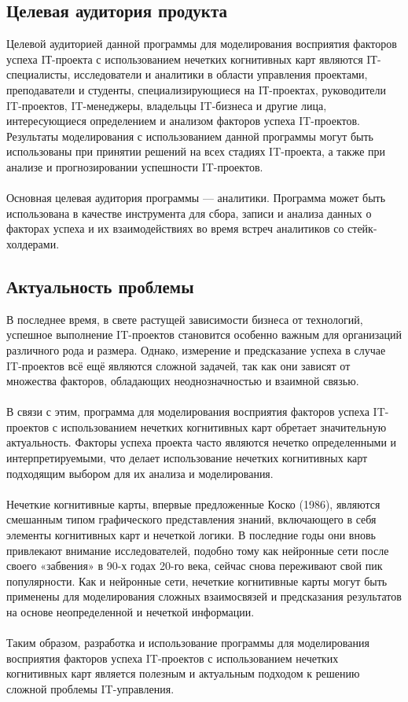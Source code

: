 \documentclass{article}
\begin{document}
    \subsection {Целевая аудитория продукта}
    Целевой аудиторией данной программы для моделирования восприятия факторов успеха IТ-проекта с использованием нечетких когнитивных карт являются IТ-специалисты, исследователи и аналитики в области управления проектами, преподаватели и студенты, специализирующиеся на IТ-проектах, руководители IT-проектов, IT-менеджеры, владельцы IT-бизнеса и другие лица, интересующиеся определением и анализом факторов успеха IT-проектов. Результаты моделирования с использованием данной программы могут быть использованы при принятии решений на всех стадиях IT-проекта, а также при анализе и прогнозировании успешности IT-проектов.\\
    ~\\
    Основная целевая аудитория программы — аналитики. Программа может быть использована в качестве инструмента для сбора, записи и анализа данных о факторах успеха и их взаимодействиях во время встреч аналитиков со стейк-холдерами.\\
    \subsection {Актуальность проблемы}
    В последнее время, в свете растущей зависимости бизнеса от технологий, успешное выполнение IT-проектов становится особенно важным для организаций различного рода и размера. Однако, измерение и предсказание успеха в случае IT-проектов всё ещё являются сложной задачей, так как они зависят от множества факторов, обладающих неоднозначностью и взаимной связью.\\
    ~\\
    В связи с этим, программа для моделирования восприятия факторов успеха IT-проектов с использованием нечетких когнитивных карт обретает значительную актуальность. Факторы успеха проекта часто являются нечетко определенными и интерпретируемыми, что делает использование нечетких когнитивных карт подходящим выбором для их анализа и моделирования.\\
    ~\\
    Нечеткие когнитивные карты, впервые предложенные Коско (1986), являются смешанным типом графического представления знаний, включающего в себя элементы когнитивных карт и нечеткой логики. В последние годы они вновь привлекают внимание исследователей, подобно тому как нейронные сети после своего «забвения» в 90-х годах 20-го века, сейчас снова переживают свой пик популярности. Как и нейронные сети, нечеткие когнитивные карты могут быть применены для моделирования сложных взаимосвязей и предсказания результатов на основе неопределенной и нечеткой информации.\\
    ~\\
    Таким образом, разработка и использование программы для моделирования восприятия факторов успеха IT-проектов с использованием нечетких когнитивных карт является полезным и актуальным подходом к решению сложной проблемы IT-управления.\\
\end{document}
